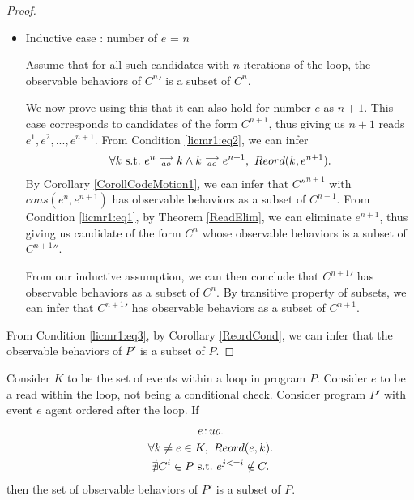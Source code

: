 \begin{proof}
\begin{itemize}
        \item Inductive case : number of $e$ = $n$

        Assume that for all such candidates with $n$ iterations of the loop, the observable behaviors of $C^{n}'$ is a subset of $C^n$.

        We now prove using this that it can also hold for number $e$ as $n + 1$. 
        This case corresponds to candidates of the form $C^{n+1}$, thus giving us $n+1$ reads $e^1, e^2,...,e^{n+1}$.
        From Condition \ref{licmr1:eq2}, we can infer 
        \begin{align*}
            \forall k \ \text{s.t.} \ e^n\stackrel{\longrightarrow}{_{ao}}k \wedge k\stackrel{\longrightarrow}{_{ao}}e^{n+1}, \ Reord(k,e^{n+1}).
        \end{align*}
        By Corollary \ref{CorollCodeMotion1}, we can infer that $C''^{n+1}$ with $cons(e^n, e^{n+1})$ has observable behaviors as a subset of $C^{n+1}$. 
        From Condition \ref{licmr1:eq1}, by Theorem \ref{ReadElim}, we can eliminate $e^{n+1}$, thus giving us candidate of the form $C^n$ whose observable behaviors is a subset of $C^{n+1}''$.

        From our inductive assumption, we can then conclude that $C^{n+1}'$ has observable behaviors as a subset of $C^n$. 
        By transitive property of subsets, we can infer that $C^{n+1}'$ has observable behaviors as a subset of $C^{n+1}$.

    \end{itemize}

    From Condition \ref{licmr1:eq3}, by Corollary \ref{ReordCond}, we can infer that the observable behaviors of $P'$ is a subset of $P$.
    
\end{proof}


\begin{corollary}
    \label{LoopInvCodeMotRead2}
    Consider $K$ to be the set of events within a loop in program $P$. 
    Consider $e$ to be a read within the loop, not being a conditional check. 
    Consider program $P'$ with event $e$ agent ordered after the loop. 
    If
    \begin{gather}
        e\!:\!\textit{uo}. \label{licmr2:eq1}\\
        \forall k \neq e \in K, \ Reord(e, k). \label{licmr2:eq2}\\ 
        \nexists C^i \in P \ \text{s.t.} \ e^{j<=i} \notin C.  \label{licmr2:eq3}                    
    \end{gather}
    then the set of observable behaviors of $P'$ is a subset of $P$.
\end{corollary}

